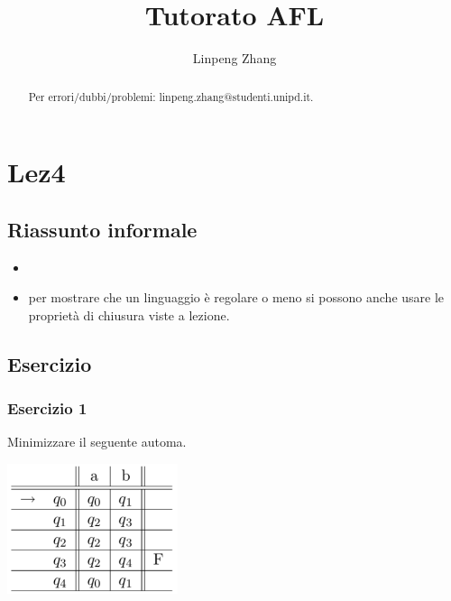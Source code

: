 \documentclass[a4paper,11pt]{article}
\begin{document}
\author{Linpeng Zhang}
\title{Tutorato AFL}
\maketitle
\begin{abstract}
    Per errori/dubbi/problemi: linpeng.zhang@studenti.unipd.it.%
\end{abstract}
\tableofcontents
\section{Lez4}
\subsection{Riassunto informale}
\begin{itemize}
    \item 
    \item per mostrare che un linguaggio è regolare o meno si possono anche usare le proprietà di chiusura viste a lezione.
\end{itemize}
\subsection{Esercizio}
\subsubsection{Esercizio 1}
Minimizzare il seguente automa.
\begin{minipage}{\linewidth}
    \centering
    \includegraphics[width=5cm]{Lez4min.png}
\end{minipage}
\end{document}
